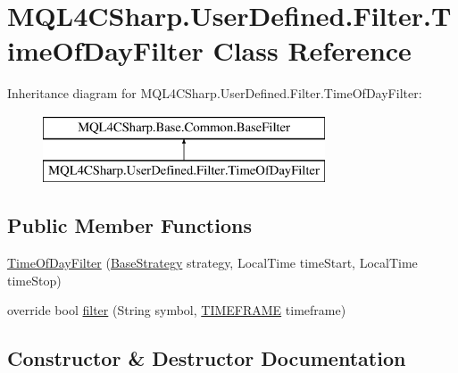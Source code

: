 \hypertarget{class_m_q_l4_c_sharp_1_1_user_defined_1_1_filter_1_1_time_of_day_filter}{}\section{M\+Q\+L4\+C\+Sharp.\+User\+Defined.\+Filter.\+Time\+Of\+Day\+Filter Class Reference}
\label{class_m_q_l4_c_sharp_1_1_user_defined_1_1_filter_1_1_time_of_day_filter}
Inheritance diagram for M\+Q\+L4\+C\+Sharp.\+User\+Defined.\+Filter.\+Time\+Of\+Day\+Filter\+:\begin{figure}[H]
\begin{center}
\leavevmode
\includegraphics[height=2.000000cm]{class_m_q_l4_c_sharp_1_1_user_defined_1_1_filter_1_1_time_of_day_filter}
\end{center}
\end{figure}
\subsection*{Public Member Functions}
\begin{DoxyCompactItemize}
\item 
\hyperlink{class_m_q_l4_c_sharp_1_1_user_defined_1_1_filter_1_1_time_of_day_filter_a04dd07030ee280fc50264f62c06d4e68}{Time\+Of\+Day\+Filter} (\hyperlink{class_m_q_l4_c_sharp_1_1_base_1_1_base_strategy}{Base\+Strategy} strategy, Local\+Time time\+Start, Local\+Time time\+Stop)
\item 
override bool \hyperlink{class_m_q_l4_c_sharp_1_1_user_defined_1_1_filter_1_1_time_of_day_filter_af56dd5f677ef901a29a33e8dcc790e77}{filter} (String symbol, \hyperlink{namespace_m_q_l4_c_sharp_1_1_base_1_1_enums_a838810aaa87c63c12737408dba8c0b35}{T\+I\+M\+E\+F\+R\+A\+ME} timeframe)
\end{DoxyCompactItemize}


\subsection{Constructor \& Destructor Documentation}

